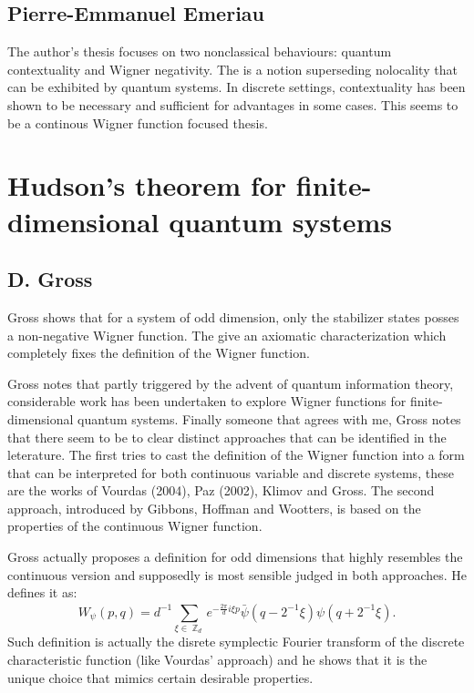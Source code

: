 \documentclass[a4paper]{article}
\DeclareMathOperator{\Z}{\mathbb{Z}}
\begin{document}
  \subsection{Pierre-Emmanuel Emeriau}

  The author's thesis focuses on two nonclassical
  behaviours: quantum contextuality and Wigner negativity.
  The is a notion superseding nolocality that can be
  exhibited by quantum systems. In discrete settings,
  contextuality has been shown to be necessary and
  sufficient for advantages in some cases. This seems to be
  a continous Wigner function focused thesis. 

  \section{Hudson's theorem for finite-dimensional quantum
  systems}

  \subsection{D. Gross}

  Gross shows that for a system of odd dimension, only the
  stabilizer states posses a non-negative Wigner function.
  The give an axiomatic characterization which completely
  fixes the definition of the Wigner function.

  Gross notes that partly triggered by the advent of quantum
  information theory, considerable work has been undertaken
  to explore Wigner functions for finite-dimensional quantum
  systems. Finally someone that agrees with me, Gross notes
  that there seem to be to clear distinct approaches that
  can be identified in the leterature. The first tries to
  cast the definition of the Wigner function into a form
  that can be interpreted for both continuous variable and
  discrete systems, these are the works of Vourdas (2004),
  Paz (2002), Klimov and Gross. The second approach,
  introduced by Gibbons, Hoffman and Wootters, is based on
  the properties of the continuous Wigner function.

  Gross actually proposes a definition for odd dimensions
  that highly resembles the continuous version and
  supposedly is most sensible judged in both approaches. He
  defines it as:
  \[
    W_\psi(p,q)
    = d^{-1} \sum_{\xi \in \Z_d}^{} e^{-\frac{2\pi}{d} i \xi p}
    \bar{\psi}(q-2^{-1}\xi) \psi(q+2^{-1}\xi).
  \] 
  Such definition is actually the disrete symplectic Fourier
  transform of the discrete characteristic function (like
  Vourdas' approach) and he shows that it is the unique
  choice that mimics certain desirable properties.
\end{document}
